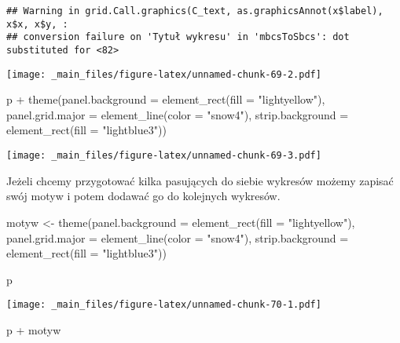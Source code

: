 \documentclass[
]{book}
\newenvironment{Shaded}{\begin{snugshade}}{\end{snugshade}}
\newcommand{\AttributeTok}[1]{\textcolor[rgb]{0.77,0.63,0.00}{#1}}
\newcommand{\FunctionTok}[1]{\textcolor[rgb]{0.00,0.00,0.00}{#1}}
\newcommand{\NormalTok}[1]{#1}
\newcommand{\OtherTok}[1]{\textcolor[rgb]{0.56,0.35,0.01}{#1}}
\newcommand{\SpecialCharTok}[1]{\textcolor[rgb]{0.00,0.00,0.00}{#1}}
\newcommand{\StringTok}[1]{\textcolor[rgb]{0.31,0.60,0.02}{#1}}
\begin{document}
\begin{verbatim}
## Warning in grid.Call.graphics(C_text, as.graphicsAnnot(x$label), x$x, x$y, :
## conversion failure on 'Tytuł wykresu' in 'mbcsToSbcs': dot substituted for <82>
\end{verbatim}

\texttt{[image: \_main\_files/figure-latex/unnamed-chunk-69-2.pdf]}

\begin{Shaded}
\begin{Highlighting}[]
\NormalTok{p }\SpecialCharTok{+} \FunctionTok{theme}\NormalTok{(}\AttributeTok{panel.background =} \FunctionTok{element\_rect}\NormalTok{(}\AttributeTok{fill =} \StringTok{"lightyellow"}\NormalTok{), }
          \AttributeTok{panel.grid.major =} \FunctionTok{element\_line}\NormalTok{(}\AttributeTok{color =} \StringTok{"snow4"}\NormalTok{),}
          \AttributeTok{strip.background =} \FunctionTok{element\_rect}\NormalTok{(}\AttributeTok{fill =} \StringTok{"lightblue3"}\NormalTok{))}
\end{Highlighting}
\end{Shaded}

\texttt{[image: \_main\_files/figure-latex/unnamed-chunk-69-3.pdf]}

Jeżeli chcemy przygotować kilka pasujących do siebie wykresów możemy zapisać swój motyw i potem dodawać go do kolejnych wykresów.

\begin{Shaded}
\begin{Highlighting}[]
\NormalTok{motyw }\OtherTok{\textless{}{-}} \FunctionTok{theme}\NormalTok{(}\AttributeTok{panel.background =} \FunctionTok{element\_rect}\NormalTok{(}\AttributeTok{fill =} \StringTok{"lightyellow"}\NormalTok{), }
               \AttributeTok{panel.grid.major =} \FunctionTok{element\_line}\NormalTok{(}\AttributeTok{color =} \StringTok{"snow4"}\NormalTok{),}
               \AttributeTok{strip.background =} \FunctionTok{element\_rect}\NormalTok{(}\AttributeTok{fill =} \StringTok{"lightblue3"}\NormalTok{))}

\NormalTok{p}
\end{Highlighting}
\end{Shaded}

\texttt{[image: \_main\_files/figure-latex/unnamed-chunk-70-1.pdf]}

\begin{Shaded}
\begin{Highlighting}[]
\NormalTok{p }\SpecialCharTok{+}\NormalTok{ motyw}
\end{Highlighting}
\end{Shaded}
\end{document}
